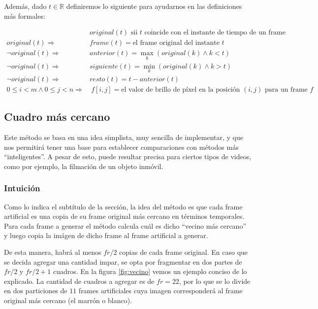 Además, dado $t \in \mathbb{R}$ definiremos lo siguiente para ayudarnos en las definiciones más formales:

\begin{align*}
    &original(t) \text{ sii } t \text{ coincide con el instante de tiempo de un frame original}\\
    original(t) \Rightarrow\ &frame(t)=\text{el frame original del instante $t$}\\
    \neg original(t) \Rightarrow\ &anterior(t) = \max_{k}(original(k) \wedge k < t)\\
    \neg original(t) \Rightarrow\ &siguiente(t) = \min_{k}(original(k) \wedge k > t)\\
    \neg original(t) \Rightarrow\ &resto(t) = t-anterior(t)\\
    0 \leq i < m \wedge 0 \leq j < n \Rightarrow&\ f[i,j] =\text{el valor de brillo de píxel en la posición $(i, j)$ para un frame $f$}
\end{align*}

\subsection{Cuadro m\'as cercano}

Este m\'etodo se basa en una idea simplista, muy sencilla de implementar, y que nos permitirá tener una base para establecer comparaciones con métodos más ``inteligentes''. A pesar de esto, puede resultar precisa para ciertos tipos de videos, como por ejemplo, la filmaci\'on de un objeto inmóvil.

\subsubsection*{\bf{Intuición}}

Como lo indica el subt\'itulo de la secci\'on, la idea del método es que cada frame artificial es una copia de su frame original más cercano en términos temporales. Para cada frame a generar el método calcula cuál es dicho ``vecino más cercano'' y luego copia la im\'agen de dicho frame al frame artificial a generar. 

De esta manera, habr\'a al menos $fr/2$ copias de cada frame original. En caso que se decida agregar una cantidad impar, se opta por fragmentar en dos partes de $fr/2$ y $fr/2+1$ cuadros. En la figura \ref{fig:vecino} vemos un ejemplo conciso de lo explicado. La cantidad de cuadros a agregar es de $fr = 22$, por lo que se lo divide en dos particiones de $11$ frames artificiales cuya imagen corresponder\'a al frame original m\'as cercano (el marr\'on o blanco).

